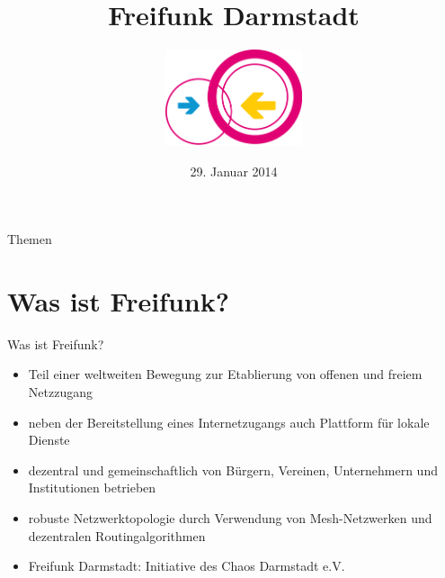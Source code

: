 \documentclass{beamer}
\title{Freifunk Darmstadt}
\author{\includegraphics[width=4cm]{../global/images/freifunk_logo}}
\date{29. Januar 2014}
\begin{document}
\begin{frame}
\maketitle
\end{frame}


\begin{frame}{Themen}
\tableofcontents
\end{frame}

\section{Was ist Freifunk?}
\begin{frame}{Was ist Freifunk?}
\begin{itemize}
	\item Teil einer weltweiten Bewegung zur Etablierung von offenen und freiem Netzzugang
	\item neben der Bereitstellung eines Internetzugangs auch Plattform für lokale Dienste
	\item dezentral und gemeinschaftlich von Bürgern, Vereinen, Unternehmern und Institutionen betrieben
	\item robuste Netzwerktopologie durch Verwendung von Mesh-Netzwerken und dezentralen Routingalgorithmen
	\item Freifunk Darmstadt: Initiative des Chaos Darmstadt e.V.
\end{itemize}
\end{frame}
\end{document}
